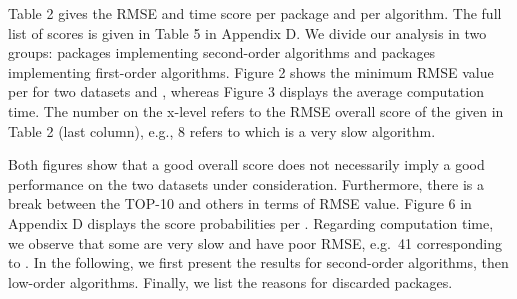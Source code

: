 Table 2 gives the RMSE and time score per package and per algorithm. The
full list of scores is given in Table 5 in Appendix D. We divide our
analysis in two groups: packages implementing second-order algorithms
and packages implementing first-order algorithms. Figure 2 shows the
minimum RMSE value per  for two datasets
 and , whereas Figure 3 displays the
average computation time. The number on the x-level refers to the RMSE
overall score of the  given in Table 2 (last
column), e.g., 8 refers to  which is a
very slow algorithm.

Both figures show that a good overall score does not necessarily imply a
good performance on the two datasets under consideration. Furthermore,
there is a break between the TOP-10  and others
in terms of RMSE value. Figure 6 in Appendix D displays the score
probabilities per . Regarding computation time,
we observe that some  are very slow and have
poor RMSE, e.g.~41 corresponding to . In the
following, we first present the results for second-order algorithms,
then low-order algorithms. Finally, we list the reasons for discarded
packages.

